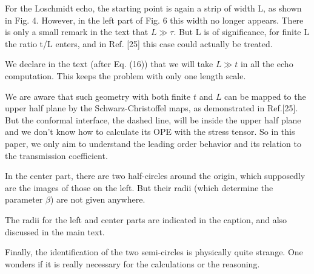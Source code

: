 \documentclass{article}
\newcommand{\reply}[1]{{\color{black}#1}}
\begin{document}
For the Loschmidt echo, the starting point is again a strip of width L, as shown in Fig. 4. However, in the left part of Fig. 6 this width no longer appears. There is only a small remark in the text that $L \gg \tau$. But L is of significance, for finite L the ratio t/L enters, and in Ref. [25] this case could actually be treated. 

\reply{We declare in the text (after Eq. (16)) that we will take $L \gg t$ in all the echo computation. This keeps the problem with only one length scale. 

  We are aware that such geometry with both finite $t$ and $L$ can be mapped to the upper half plane by the Schwarz-Christoffel maps, as demonstrated in Ref.[25]. But the conformal interface, the dashed line, will be inside the upper half plane and we don't know how to calculate its OPE with the stress tensor. So in this paper, we only aim to understand the leading order behavior and its relation to the transmission coefficient. }

In the center part, there are two half-circles around the origin, which supposedly are the images of those on the left. But their radii (which determine the parameter $\beta$) are not given anywhere. 

\reply{The radii for the left and center parts are indicated in the caption, and also discussed in the main text.}

Finally, the identification of the two semi-circles is physically quite strange. One wonders if it is really necessary for the calculations or the reasoning.
\end{document}
